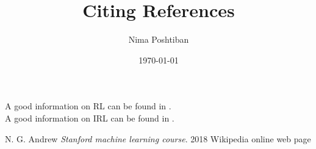 \documentclass{article}
\author{Nima Poshtiban}
\date{\today}
\title{Citing References}
\begin{document}
\maketitle
A good information on RL can be found in  \cite{andrew,Wikipedia}.\\
A good information on IRL can be found in \cite{Wikipedia}.

\vspace{1cm}
\begin{thebibliography}{2} %
N. G. Andrew \textit{Stanford machine learning course}. 2018
Wikipedia online web page
\end{thebibliography}
\end{document}
